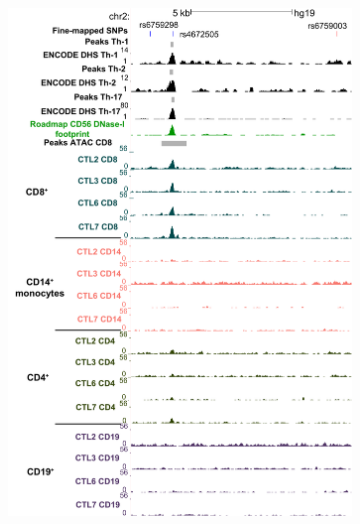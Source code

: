 \begin{figure}[htbp]
\centering
\begin{subfigure}[b]{0.5\textwidth}
\centering
\includegraphics[width=\textwidth]{./Results2/pdfs/chr2p15_rs4672505_FM_all_cell_types_track_all_marks}
\caption{\textbf{}}
\end{subfigure}%
\begin{subfigure}[b]{0.45\textwidth}
\centering

\end{subfigure}
\end{figure}

